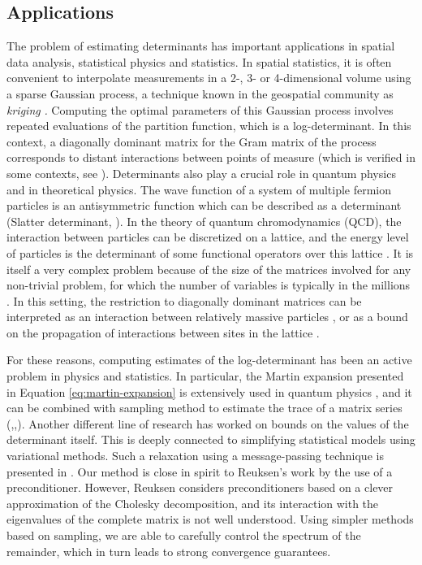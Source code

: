 \subsection{Applications} 
The problem of estimating determinants has
important applications in spatial data analysis, statistical physics
and statistics. In spatial statistics, it is often convenient to interpolate
measurements in a 2-, 3- or 4-dimensional volume using a sparse Gaussian
process, a technique known in the geospatial community as \emph{kriging
}\cite{zhang2010kriging,li2005analysis}\emph{. }Computing the optimal
parameters of this Gaussian process involves repeated evaluations
of the partition function, which is a log-determinant. In this context,
a diagonally dominant matrix for the Gram matrix of the process corresponds
to distant interactions between points of measure (which is verified
in some contexts, see \cite{KelleyPace1997291}). Determinants also
play a crucial role in quantum physics and in theoretical physics.
The wave function of a system of multiple fermion particles is an
antisymmetric function which can be described as a determinant (Slatter
determinant, \cite{atkins2011molecular,lowdin1955quantum}). In the
theory of quantum chromodynamics (QCD), the interaction between particles
can be discretized on a lattice, and the energy level of particles
is the determinant of some functional operators over this lattice
\cite{duncan1998efficient}. It is itself a very complex problem because
of the size of the matrices involved for any non-trivial problem,
for which the number of variables is typically in the millions \cite{bernardson1994monte}.
In this setting, the restriction to diagonally dominant matrices can
be interpreted as an interaction between relatively massive particles
\cite{deForcrand1989516}, or as a bound on the propagation of interactions
between sites in the lattice \cite{bernardson1994monte}.

For these reasons, computing estimates of the log-determinant has
been an active problem in physics and statistics. In particular, the
Martin expansion presented in Equation \ref{eq:martin-expansion}
is extensively used in quantum physics \cite{Ipsen2006}, and it can
be combined with sampling method to estimate the trace of a matrix
series (\cite{Zhang2008},\cite{McCourt2008},\cite{Zhang2007}).
Another different line of research has worked on bounds on the values
of the determinant itself. This is deeply connected to simplifying
statistical models using variational methods. Such a relaxation using
a message-passing technique is presented in \cite{Wainwright2006}.
Our method is close in spirit to Reuksen's work \cite{Reusken2002}
by the use of a preconditioner. However, Reuksen considers preconditioners
based on a clever approximation of the Cholesky decomposition, and
its interaction with the eigenvalues of the complete matrix is not
well understood. Using simpler methods based on sampling, we are able
to carefully control the spectrum of the remainder, which in turn leads
to strong convergence guarantees.

